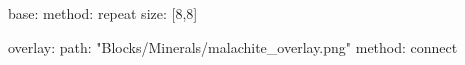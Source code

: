 base:
  method: repeat
  size: [8,8]

overlay:
  path: "Blocks/Minerals/malachite_overlay.png"
  method: connect
  
